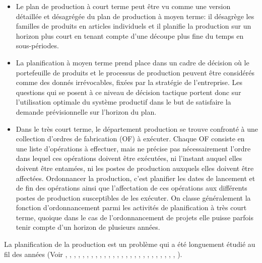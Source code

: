 \begin{itemize}[label=$\square$]
	
\item Le plan de production à court terme peut être vu comme une version détaillée et désagrégée du plan de production à moyen terme: il désagrège les familles de produits en articles individuels et il planifie la production sur un horizon plus court en tenant compte d'une découpe plus fine du temps en sous-périodes. 

\item La planification à moyen terme prend place dans un cadre de décision où le portefeuille de produits  et  le  processus  de  production  peuvent  être  considérés  comme  des  donnés irrévocables, fixées par la stratégie de l'entreprise. Les questions qui se posent à ce niveau de décision tactique portent donc sur l'utilisation optimale du système productif dans le but de satisfaire la demande prévisionnelle sur l'horizon du plan. 

\item Dans le très court terme, le département production se trouve confronté à une collection d'ordres de fabrication (OF) à exécuter. Chaque OF consiste en une liste d'opérations à effectuer, mais ne précise pas nécessairement l'ordre dans lequel ces opérations doivent être exécutées, ni l'instant auquel elles doivent être entamées, ni les postes de production auxquels elles doivent être affectées. Ordonnancer la production, c'est planifier les dates de lancement et de fin des opérations ainsi que l'affectation de ces opérations aux différents postes de production  susceptibles  de  les  exécuter.  On  classe  généralement  la  fonction d'ordonnancement parmi les activités de planification à très court terme, quoique dans le cas de l'ordonnancement de projets elle puisse parfois tenir compte d'un horizon de plusieurs années.
\end{itemize}

La planification de la production est un problème qui a été longuement étudié au fil des années (Voir \cite{PPP_Samir_2010}, \cite{PPP_Dmitry_2017}, \cite{RePEc:eee:ejores:v:261:y:2017:i:1:p:67-74}, \cite{845896A-survey-of-design}, \cite{PPP_Sandeep_2018}, \cite{PPP_Weiwei_2018}, \cite{PPP_Doga_2020}, \cite{PPP_Dev}, \cite{PPP_Saman_2016}, \cite{PPP_Yuvraj_2015}, \cite{PPP_Fanny_2016}, \cite{article-Irani-Algorithmic}, \cite{PPP_Kuttner_2009}, \cite{PPP_Yan_2009}, \cite{PPP_Yanfei_2010}, \cite{PPP_Jingran_2019}, \cite{PPP_Esmaeil_2018}, \cite{article_prod2}, \cite{article_prod1}, \cite{article_prod3}, \cite{article_prod4}, \cite{quilliot:hal-01366540}, \cite{article-Homogeneously-alain}, \cite{PPP_Lixin_2012}, \cite{PPP_Nicolas_2019}, \cite{PPP_Guisen_2020}, \cite{PPP_Hui_2019}).


